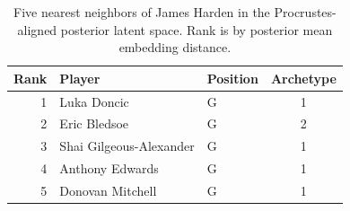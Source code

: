 \begin{table}[htbp]
  \centering\small
  \begin{tabular}{rllc}
    \toprule
    Rank & Player & Position & Archetype \\
    \midrule
    1 & Luka Doncic & G & 1 \\
    2 & Eric Bledsoe & G & 2 \\
    3 & Shai Gilgeous-Alexander & G & 1 \\
    4 & Anthony Edwards & G & 1 \\
    5 & Donovan Mitchell & G & 1 \\
    \bottomrule
  \end{tabular}
  \caption{Five nearest neighbors of James Harden in the Procrustes-aligned posterior latent space. Rank is by posterior mean embedding distance.}
  \label{tab:James_Harden_neighbors}
\end{table}

